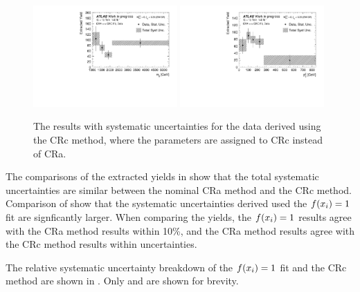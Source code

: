 \begin{figure}[t]
  \centering
  \includegraphics[width=0.49\textwidth]{plots/diffx/final/data/cra/Extracted_Yield_data_mjj_ngapjets_QCD_Sh2211_0p01sigma}
  \includegraphics[width=0.49\textwidth]{plots/diffx/final/data/cra/Extracted_Yield_data_jj_pt_ngapjets_QCD_Sh2211_0p01sigma}
  \caption{The \new results with systematic uncertainties for the data derived using the CRc method, where the \bl parameters are assigned to CRc instead of CRa.\label{fig:vbswy:crc_nEW}}
\end{figure}

The comparisons of the extracted yields in  show that the total systematic uncertainties are similar between the nominal CRa method and the CRc method. Comparison of  show that the systematic uncertainties derived used the $f(x_i)=1$ fit are signficantly larger. When comparing the yields, the $f(x_i)=1$ results agree with the CRa method results within 10\%, and the CRa method results agree with the CRc method results within uncertainties. 

The relative systematic uncertainty breakdown of the $f(x_i)=1$ fit and the CRc method are shown in . Only \mjj and \jjpt are shown for brevity.

